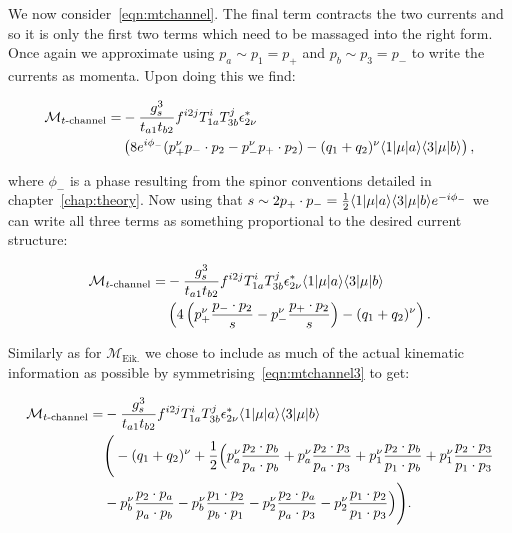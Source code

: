 	We now consider~\eqref{eqn:mtchannel}.  The final term contracts the two currents and so it is
	only the first two terms which need to be massaged into the right form.  Once again we
	approximate using $p_a\sim p_1=p_+$ and $p_b\sim p_3=p_-$ to write the currents as momenta.
	Upon doing this we find:

	\begin{align}
	\begin{split}
		\mathcal{M}_{t\text{-channel}} = &-\frac{g_s^3}{t_{a1}t_{b2}}f^{i2j}T^i_{1a}T^j_{3b} \epsilon^*_{2\nu} \\
		&\left(8e^{i\phi_-}(p_+^\nu p_-\cdot p_2 - p_-^\nu p_+\cdot p_2) - (q_1 + q_2)^\nu \langle 1 | \mu | a \rangle\langle 3 | \mu | b \rangle \right),
		\label{eqn:mtchannel2}
	\end{split}
	\end{align}

	where $\phi_-$ is a phase resulting from the spinor conventions detailed in chapter~\ref{chap:theory}.
	Now using that $s\sim2p_+\cdot p_-=\frac{1}{2}\langle 1 | \mu | a \rangle\langle 3 | \mu | b \rangle e^{-i\phi_-}$ we can write all
	three terms as something proportional to the desired current structure:

	\begin{align}
	\begin{split}
		\mathcal{M}_{t\text{-channel}} = &-\frac{g_s^3}{t_{a1}t_{b2}}f^{i2j}T^i_{1a}T^j_{3b} \epsilon^*_{2\nu}
		\langle 1 | \mu | a \rangle\langle 3 | \mu | b \rangle \\&\left(4\left(p_+^\nu \frac{p_-\cdot p_2}{s} - p_-^\nu \frac{p_+\cdot p_2}{s}\right)
		- (q_1 + q_2)^\nu \right).
		\label{eqn:mtchannel3}
	\end{split}
	\end{align}

	Similarly as for $\mathcal{M}_{\text{Eik.}}$ we chose to include as much of the actual
	kinematic information as possible by symmetrising~\eqref{eqn:mtchannel3} to get:

	\begin{align}
	\begin{split}
		\mathcal{M}_{t\text{-channel}} = &-\frac{g_s^3}{t_{a1}t_{b2}}f^{i2j}T^i_{1a}T^j_{3b} \epsilon^*_{2\nu}
		\langle 1 | \mu | a \rangle\langle 3 | \mu | b \rangle\\
		&\Bigg(-(q_1 + q_2)^\nu + \frac{1}{2}\Big(
		p_a^\nu \frac{p_2\cdot p_b}{p_a\cdot p_b} + p_a^\nu \frac{p_2\cdot p_3}{p_a\cdot p_3} +
		p_1^\nu \frac{p_2\cdot p_b}{p_1\cdot p_b} + p_1^\nu \frac{p_2\cdot p_3}{p_1\cdot p_3}  \\
	       &-p_b^\nu \frac{p_2\cdot p_a}{p_a\cdot p_b} - p_b^\nu \frac{p_1\cdot p_2}{p_b\cdot p_1} -
		p_2^\nu \frac{p_2\cdot p_a}{p_a\cdot p_3} - p_2^\nu \frac{p_1\cdot p_2}{p_1\cdot p_3}
		\Big)
		\Bigg).
		\label{eqn:mtchannel4}
	\end{split}
	\end{align}

